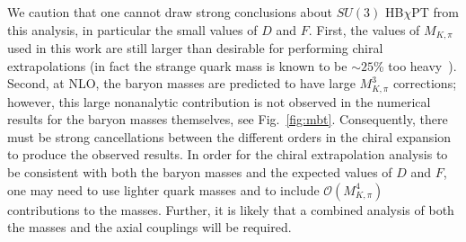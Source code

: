 \documentclass[twocolumn,nofootinbib,prd,aps,superscriptaddress,tightenlines]{revtex4}
\def\mc#1{{\mathcal{#1}}}
\begin{document}
We caution that one cannot draw strong conclusions about $SU(3)$ HB$\chi$PT from this analysis, in particular the small values of $D$ and $F$.  First, the values of $M_{K,\pi}$ used in this work are still larger than desirable for performing chiral extrapolations (in fact the strange quark mass is known to be $\sim25$\% too heavy~\cite{Aubin:2004ck}).  Second, at NLO, the baryon masses are predicted to have large $M_{K,\pi}^3$ corrections; however, this large nonanalytic contribution is not observed in the numerical results for the baryon masses themselves, see Fig.~\ref{fig:mbt}.  Consequently, there must be strong cancellations between the different orders in the chiral expansion to produce the observed results.  In order for the chiral extrapolation analysis to be consistent with both the baryon masses and the expected values of $D$ and $F$, one may need to use lighter quark masses and to include $\mc{O}(M_{K,\pi}^4)$ contributions to the masses.  Further, it is likely that a combined analysis of both the masses and the axial couplings will be required.
\end{document}
